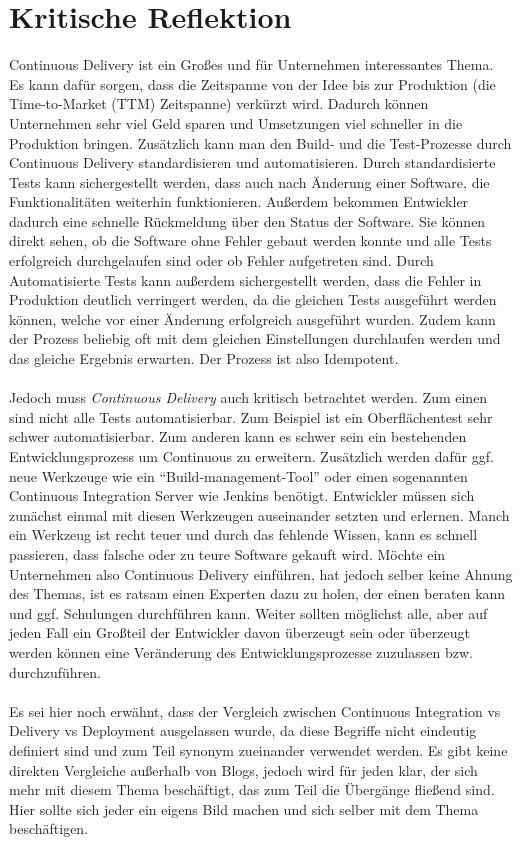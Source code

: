 \section{Kritische Reflektion}
\label{sec:kritischeRelfektion}
Continuous Delivery ist ein Großes und für Unternehmen interessantes Thema. Es kann dafür sorgen, dass die Zeitspanne von der Idee bis zur Produktion (die Time-to-Market (TTM) Zeitspanne) verkürzt wird. Dadurch können Unternehmen sehr viel Geld sparen und Umsetzungen viel schneller in die Produktion bringen. Zusätzlich kann man den Build- und die Test-Prozesse durch Continuous Delivery standardisieren und automatisieren. Durch standardisierte Tests kann sichergestellt werden, dass auch nach Änderung einer Software, die Funktionalitäten weiterhin funktionieren. Außerdem bekommen Entwickler dadurch eine schnelle Rückmeldung über den Status der Software. Sie können direkt sehen, ob die Software ohne Fehler gebaut werden konnte und alle Tests erfolgreich durchgelaufen sind oder ob Fehler aufgetreten sind. Durch Automatisierte Tests kann außerdem sichergestellt werden, dass die Fehler in Produktion deutlich verringert werden, da die gleichen Tests ausgeführt werden können, welche vor einer Änderung erfolgreich ausgeführt wurden. Zudem kann der Prozess beliebig oft mit dem gleichen Einstellungen durchlaufen werden und das gleiche Ergebnis erwarten. Der Prozess ist also Idempotent.
\\\\
Jedoch muss \textit{Continuous Delivery} auch kritisch betrachtet werden. Zum einen sind nicht alle Tests automatisierbar. Zum Beispiel ist ein Oberflächentest sehr schwer automatisierbar. Zum anderen kann es schwer sein ein bestehenden Entwicklungsprozess um Continuous zu erweitern. Zusätzlich werden dafür ggf. neue Werkzeuge wie ein "`Build-management-Tool"' oder einen sogenannten Continuous Integration Server wie Jenkins benötigt. Entwickler müssen sich zunächst einmal mit diesen Werkzeugen auseinander setzten und erlernen. Manch ein Werkzeug ist recht teuer und durch das fehlende Wissen, kann es schnell passieren, dass falsche oder zu teure Software gekauft wird. Möchte ein Unternehmen also Continuous Delivery einführen, hat jedoch selber keine Ahnung des Themas, ist es ratsam einen Experten dazu zu holen, der einen beraten kann und ggf. Schulungen durchführen kann. Weiter sollten möglichst alle, aber auf jeden Fall ein Großteil der Entwickler davon überzeugt sein oder überzeugt werden können eine Veränderung des Entwicklungsprozesse zuzulassen bzw. durchzuführen.
\\\\
Es sei hier noch erwähnt, dass der Vergleich zwischen Continuous Integration vs Delivery vs Deployment ausgelassen wurde, da diese Begriffe nicht eindeutig definiert sind und zum Teil synonym zueinander verwendet werden. Es gibt keine direkten Vergleiche außerhalb von Blogs, jedoch wird für jeden klar, der sich mehr mit diesem Thema beschäftigt, das zum Teil die Übergänge fließend sind. Hier sollte sich jeder ein eigens Bild machen und sich selber mit dem Thema beschäftigen.

